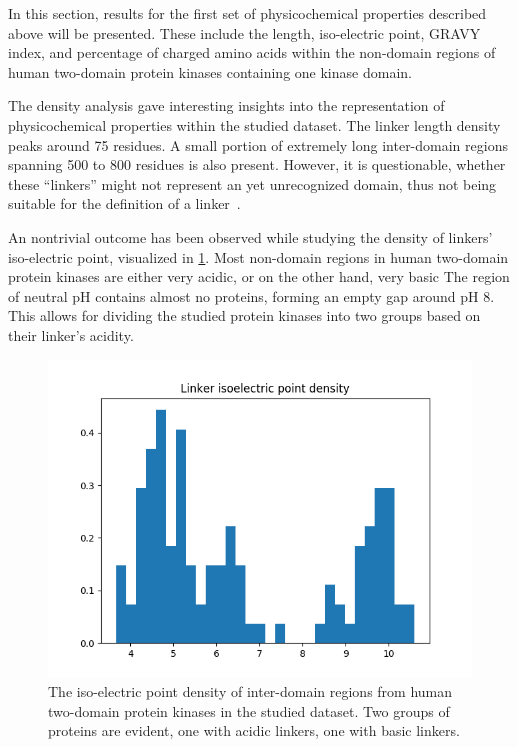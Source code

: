 \label{res}

\label{res:first}

	In this section, results for the first set of physicochemical properties described
	above will be presented.
	These include the length, iso-electric point, GRAVY index, and percentage of charged
	amino acids within the non-domain regions of human two-domain protein kinases containing
	one kinase domain.

	\label{res:first:dens}

		The density analysis gave interesting insights into the representation of
		physicochemical properties within the studied dataset.
		The linker length density peaks around 75 residues.
		A small portion of extremely long inter-domain regions spanning 500 to 800 residues is
		also present.
		However, it is questionable, whether these ``linkers'' might not represent an yet
		unrecognized domain, thus not being suitable for the definition of a
		linker~\cite{milano2016structural}.

		An nontrivial outcome has been observed while studying the density of linkers'
		iso-electric point, visualized in \cref{fig:iso-dens}.
		Most non-domain regions in human two-domain protein kinases are either very acidic, or
		on the other hand, very basic
		The region of neutral pH contains almost no proteins, forming an empty gap around pH
		8.
		This allows for dividing the studied protein kinases into two groups based on their
		linker's acidity.

		\begin{figure}
			\centering
			\includegraphics[width=.7\linewidth]{img/iso_density.png}
			\caption{The iso-electric point density of inter-domain regions from human
			two-domain protein kinases in the studied dataset. Two groups of proteins are
			evident, one with acidic linkers, one with basic linkers.}
			\label{fig:iso-dens}
		\end{figure}


